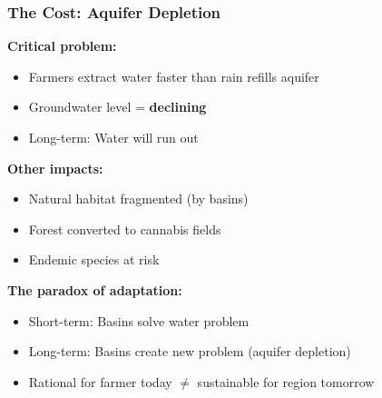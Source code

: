 \documentclass{beamer}
\begin{document}
\begin{frame}
\frametitle{The Cost: Aquifer Depletion}

\textbf{Critical problem:}
\begin{itemize}
  \item Farmers extract water faster than rain refills aquifer
  \item Groundwater level = \textbf{declining}
  \item Long-term: Water will run out
\end{itemize}

\vspace{0.3cm}

\textbf{Other impacts:}
\begin{itemize}
  \item Natural habitat fragmented (by basins)
  \item Forest converted to cannabis fields
  \item Endemic species at risk
\end{itemize}

\vspace{0.3cm}

\textbf{The paradox of adaptation:}
\begin{itemize}
  \item Short-term: Basins solve water problem
  \item Long-term: Basins create new problem (aquifer depletion)
  \item Rational for farmer today $\neq$ sustainable for region tomorrow
\end{itemize}

\end{frame}

\end{document}
